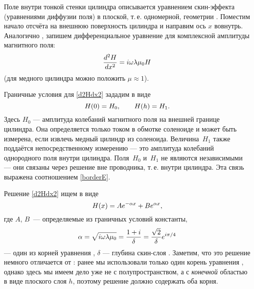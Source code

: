 Поле внутри тонкой стенки цилиндра описывается уравнением скин-эффекта
(уравнениями диффузии поля) в плоской, т.\,е. одномерной, геометрии .
Поместим начало отсчёта на внешнюю поверхность цилиндра и направим ось $x$ вовнутрь.
Аналогично , 
запишем дифференциальное уравнение для комплексной амплитуды магнитного поля:
\begin{equation}\eqmark{d2Hdx2}
\frac{d^2H}{dx^2} = i\omega \lambda \mu_0 H
\end{equation}
(для медного цилиндра можно положить $\mu\approx 1$).

Граничные условия для \eqref{d2Hdx2} зададим в виде
\begin{equation}\eqmark{borderH}
H(0) = H_0,\qquad H(h) = H_1.
\end{equation}
Здесь $H_0$ --- амплитуда колебаний магнитного поля на внешней
границе цилиндра. Она определяется только током в обмотке соленоиде 
и может быть измерена, если извлечь медный цилиндр из соленоида.
Величина~$H_1$ также поддаётся непосредственному измерению --- это 
амплитуда колебаний однородного поля внутри цилиндра.
Поля~$H_0$ и~$H_1$ не являются независимыми --- они связаны через 
решение вне проводника, т.\,е. внутри цилиндра. Эта связь
выражена соотношением \eqref{borderE}.


Решение \eqref{d2Hdx2} ищем в виде 
\begin{equation} \eqmark{24}
H(x)=A e^{-\alpha x}+ B e^{\alpha x},
\end{equation}
где $A$, $B$~--- определяемые из граничных условий константы, 
\begin{equation}\eqmark{alpha}
\alpha=\sqrt{i\omega \lambda \mu_0}=\frac{1+i}{\delta} = 
\frac{\sqrt{2}}{\delta} e^{i\pi/4}
\end{equation} --- один из корней уравнения ,
$\delta$ --- глубина скин-слоя .
Заметим, что это решение немного отличается от : ранее мы использовали только 
один корень уравнения , однако здесь мы имеем дело уже не с 
полупространством, а с \emph{конечной} областью в виде плоского слоя $h$, 
поэтому решение должно содержать оба корня.

